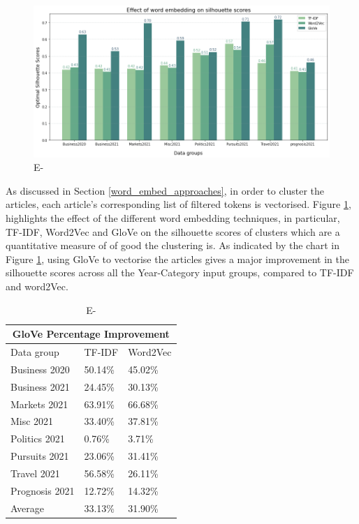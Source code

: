 \begin{figure}[H]
\centering
\includegraphics[width=0.7\linewidth]{images/eval/word_embedding.png}
\caption{E-}
\label{fig:word_embed}
\end{figure}
\vspace{-1em}
As discussed in Section \ref{word_embed_approaches}, in order to cluster the articles, each article's corresponding list of filtered tokens is vectorised. Figure \ref{fig:word_embed}, highlights the effect of the different word embedding techniques, in particular, TF-IDF, Word2Vec and GloVe on the silhouette scores of clusters which are a quantitative measure of of good the clustering is. As indicated by the chart in Figure \ref{fig:word_embed}, using GloVe to vectorise the articles gives a major improvement in the silhouette scores across all the Year-Category input groups, compared to TF-IDF and word2Vec.

\begin{table}[H]
\centering
\renewcommand{\arraystretch}{1.05}
\begin{tabularx}{0.7\textwidth}{X X X} 
\multicolumn{3}{c}{GloVe Percentage Improvement} \\
 \hline
 Data group & TF-IDF & Word2Vec \\
 \hline
 Business 2020 & 50.14\% & 45.02\%  \\ 
 Business 2021 & 24.45\% & 30.13\%  \\
 Markets 2021 & 63.91\% & 66.68\% \\
 Misc 2021 & 33.40\% & 37.81\% \\
 Politics 2021 & 0.76\% & 3.71\% \\
 Pursuits 2021 & 23.06\% & 31.41\%  \\ 
 Travel 2021 & 56.58\% & 26.11\% \\
 Prognosis 2021 & 12.72\% & 14.32\% \\ 
 \hline
 Average & 33.13\% & 31.90\% \\ 
\end{tabularx}
\caption{E-}
\label{table:word_embed}
\end{table}
\vspace{-1em}

